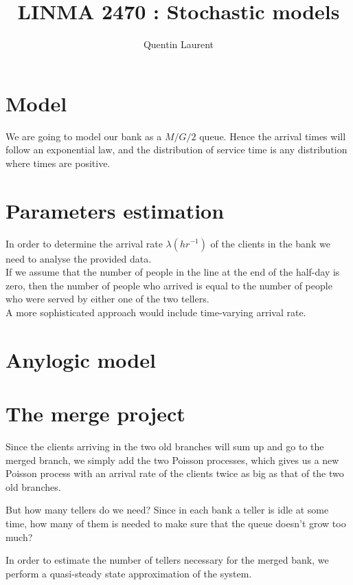 \documentclass[12pt,a4paper,notitlepage]{report}
\title{LINMA 2470 : Stochastic models}
\author{Quentin Laurent}
\begin{document}
\maketitle
\section*{Model}
We are going to model our bank as a $M/G/2$ queue. Hence the arrival times will follow an exponential law, and the distribution of service time is any distribution where times are positive.
\section*{Parameters estimation}
In order to determine the arrival rate $\lambda (hr^{-1})$ of the clients in the bank we need to analyse the provided data.\\
If we assume that the number of people in the line at the end of the half-day is zero, then the number of people who arrived is equal to the number of people who were served by either one of the two tellers.\\
A more sophisticated approach would include time-varying arrival rate.


\section*{Anylogic model}


\section*{The merge project}
 Since the clients arriving in the two old branches will sum up and go to the merged branch, we simply add the two Poisson processes, which gives us a new Poisson process with an arrival rate of the clients twice as big as that of the two old branches.

But how many tellers do we need? Since in each bank a teller is idle at some time, how many of them is needed to make sure that the queue doesn't grow too much?


In order to estimate the number of tellers necessary for the merged bank, we perform a quasi-steady state approximation of the system.
\end{document}
